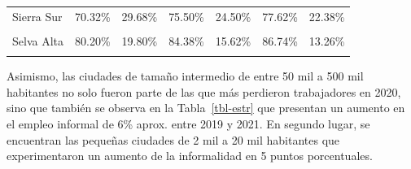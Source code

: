 \documentclass[
  letterpaper,
  12pt,
  oneside,
  spanish,
  doublespacing,
  headsepline,
  parskip]{MastersDoctoralThesis}
\begin{document}
\begin{table}[H]
\begin{tabular}{lcccccc}
Sierra Sur & 70.32\% & 29.68\% & 75.50\% & 24.50\% & 77.62\% & 22.38\%\\
\cellcolor{gray!6}{Selva Baja} & \cellcolor{gray!6}{74.84\%} & \cellcolor{gray!6}{25.16\%} & \cellcolor{gray!6}{80.69\%} & \cellcolor{gray!6}{19.31\%} & \cellcolor{gray!6}{83.04\%} & \cellcolor{gray!6}{16.96\%}\\
Selva Alta & 80.20\% & 19.80\% & 84.38\% & 15.62\% & 86.74\% & 13.26\%\\
\addlinespace
\cellcolor{gray!6}{Lima Metropolitana} & \cellcolor{gray!6}{58.60\%} & \cellcolor{gray!6}{41.40\%} & \cellcolor{gray!6}{58.22\%} & \cellcolor{gray!6}{41.78\%} & \cellcolor{gray!6}{61.99\%} & \cellcolor{gray!6}{38.01\%}\\
\bottomrule
\end{tabular}
\endgroup{}
\end{table}

Asimismo, las ciudades de tamaño intermedio de entre 50 mil a 500 mil
habitantes no solo fueron parte de las que más perdieron trabajadores en
2020, sino que también se observa en la Tabla~\ref{tbl-estr} que
presentan un aumento en el empleo informal de 6\% aprox. entre 2019 y
2021. En segundo lugar, se encuentran las pequeñas ciudades de 2 mil a
20 mil habitantes que experimentaron un aumento de la informalidad en 5
puntos porcentuales.
\end{document}
